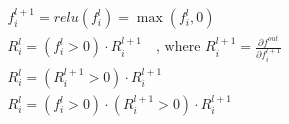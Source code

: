\documentclass{article}
\begin{document}
\begin{align}
  &f^{l+1}_i = relu(f^l_i) = \max(f^l_i, 0) \\
  &R^l_i = (f^l_i > 0) \cdot R^{l+1}_i \quad \text{, where } R^{l+1}_i =
  \frac{\partial f^{out}}{\partial f^{l+1}_i} \\
  &R^l_i = \left(R^{l+1}_i > 0 \right) \cdot R^{l+1}_i \\
  &R^l_i = (f^l_i > 0) \cdot \left (R^{l+1}_i > 0 \right) \cdot
  R^{l+1}_i \\
\end{align}
\end{document}
